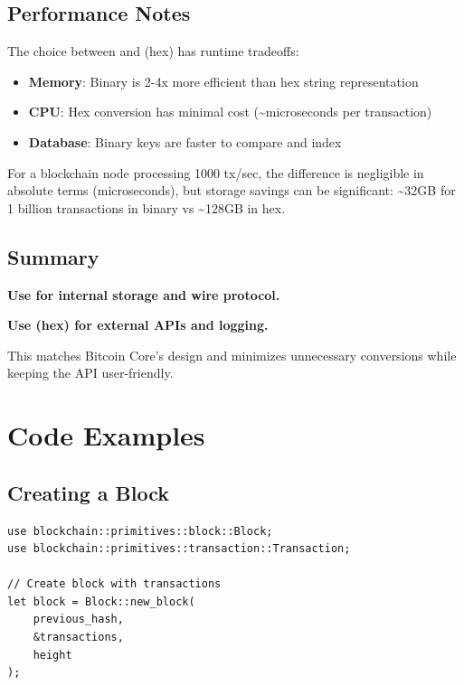 \subsection{Performance Notes}
\label{sec:ch06-performance-notes}

The choice between  and  (hex) has runtime tradeoffs:

\begin{itemize}
  \item \textbf{Memory}: Binary is 2-4x more efficient than hex string representation
  \item \textbf{CPU}: Hex conversion has minimal cost (\textasciitilde microseconds per transaction)
  \item \textbf{Database}: Binary keys are faster to compare and index
\end{itemize}

For a blockchain node processing 1000 tx/sec, the difference is negligible in absolute terms (microseconds), but storage savings can be significant: \textasciitilde 32GB for 1 billion transactions in binary vs \textasciitilde 128GB in hex.

\subsection{Summary}
\label{sec:ch06-txid-summary}

\textbf{Use  for internal storage and wire protocol.}

\textbf{Use  (hex) for external APIs and logging.}

This matches Bitcoin Core's design and minimizes unnecessary conversions while keeping the API user-friendly.

\needspace{4in}
\section{Code Examples}
\label{sec:ch06-code-examples}

\subsection{Creating a Block}
\label{sec:ch06-create-block}

\begin{listing}[H]
\caption{Creating a block with transactions}
\label{lst:ch06-27}
\begin{verbatim}
use blockchain::primitives::block::Block;
use blockchain::primitives::transaction::Transaction;

// Create block with transactions
let block = Block::new_block(
    previous_hash,
    &transactions,
    height
);
\end{verbatim}
\end{listing}

